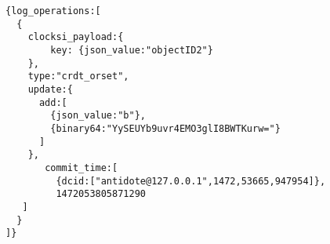 \begin{lstlisting}[caption={Antidote log response example},label={lst:log_example}]
{log_operations:[
  {
    clocksi_payload:{
        key: {json_value:"objectID2"}
    },
    type:"crdt_orset",
    update:{
      add:[
        {json_value:"b"},
        {binary64:"YySEUYb9uvr4EMO3glI8BWTKurw="}
      ]
    },
       commit_time:[
         {dcid:["antidote@127.0.0.1",1472,53665,947954]},
         1472053805871290
   ]
  }
]}
\end{lstlisting}




